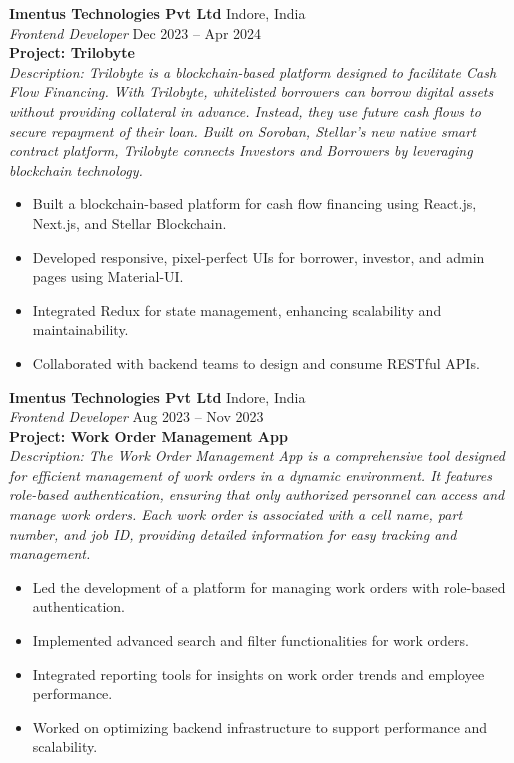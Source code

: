 \documentclass[a4paper,11pt]{article}
\begin{document}
\noindent\textbf{Imentus Technologies Pvt Ltd} \hfill Indore, India \\
\textit{Frontend Developer} \hfill Dec 2023 – Apr 2024 \\
\textbf{Project: Trilobyte} \\
\textit{Description: Trilobyte is a blockchain-based platform designed to facilitate Cash Flow Financing. With Trilobyte, whitelisted borrowers can borrow digital assets without providing collateral in advance. Instead, they use future cash flows to secure repayment of their loan. Built on Soroban, Stellar's new native smart contract platform, Trilobyte connects Investors and Borrowers by leveraging blockchain technology.}\\

\begin{itemize}[leftmargin=*]
    \item Built a blockchain-based platform for cash flow financing using React.js, Next.js, and Stellar Blockchain.
    \item Developed responsive, pixel-perfect UIs for borrower, investor, and admin pages using Material-UI.
    \item Integrated Redux for state management, enhancing scalability and maintainability.
    \item Collaborated with backend teams to design and consume RESTful APIs.
\end{itemize}

\noindent\textbf{Imentus Technologies Pvt Ltd} \hfill Indore, India \\
\textit{Frontend Developer} \hfill Aug 2023 – Nov 2023 \\
\textbf{Project: Work Order Management App} \\
\textit{Description: The Work Order Management App is a comprehensive tool designed for efficient management of work orders in a dynamic environment. It features role-based authentication, ensuring that only authorized personnel can access and manage work orders. Each work order is associated with a cell name, part number, and job ID, providing detailed information for easy tracking and management.}\\
\begin{itemize}[leftmargin=*]
    \item Led the development of a platform for managing work orders with role-based authentication.
    \item Implemented advanced search and filter functionalities for work orders.
    \item Integrated reporting tools for insights on work order trends and employee performance.
    \item Worked on optimizing backend infrastructure to support performance and scalability.
\end{itemize}
\end{document}
